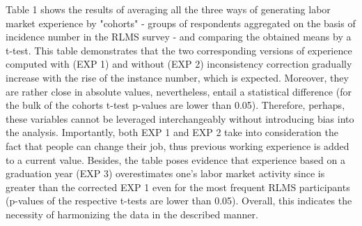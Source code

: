 \documentclass[12pt,a4paper]{article}
\begin{document}
Table 1 shows the results of averaging all the three ways of generating labor market experience by "cohorts" - groups of respondents aggregated on the basis of incidence number in the RLMS survey - and comparing the obtained means by a t-test. This table demonstrates that the two corresponding versions of experience computed with (EXP 1) and without (EXP 2) inconsistency correction gradually increase with the rise of the instance number, which is expected. Moreover, they are rather close in absolute values, nevertheless, entail a statistical difference (for the bulk of the cohorts t-test p-values are lower than 0.05). Therefore, perhaps, these variables cannot be leveraged interchangeably without introducing bias into the analysis. Importantly, both EXP 1 and EXP 2 take into consideration the fact that people can change their job, thus previous working experience is added to a current value. Besides, the table poses evidence that experience based on a graduation year (EXP 3) overestimates one's labor market activity since is greater than the corrected EXP 1 even for the most frequent RLMS participants (p-values of the respective t-tests are lower than 0.05). Overall, this indicates the necessity of harmonizing the data in the described manner. 
\\
\end{document}
